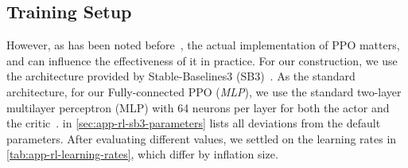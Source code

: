 \subsection{Training Setup}
\label{subsec:rl-training}

However, as has been noted before~\cite{Engstrom2020Implementation,Hsu2020Revisiting}, the actual implementation of PPO matters,
and can influence the effectiveness of it in practice. For our construction, we use
the architecture provided by Stable-Baselines3 (SB3)~\cite{StableBaselines2026PPO}.
As the standard architecture, for our Fully-connected PPO (\emph{MLP}), we use the standard two-layer multilayer perceptron (MLP) with 64 neurons
per layer for both the actor and the critic~\cite{StableBaselines2026Policy}.  in
\cref{sec:app-rl-sb3-parameters} lists all deviations from the default parameters. After evaluating different values, we settled on the
learning rates in \cref{tab:app-rl-learning-rates}, which differ by inflation size.

